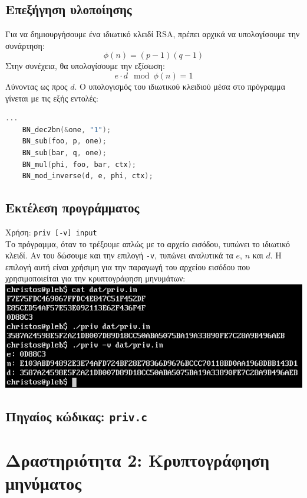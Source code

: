 \documentclass[12pt]{article}
\begin{document}
\subsection{Επεξήγηση υλοποίησης}

Για να δημιουργήσουμε ένα ιδιωτικό κλειδί RSA, πρέπει αρχικά να υπολογίσουμε
την συνάρτηση:
\[\phi(n) = (p-1)(q-1)\]
Στην συνέχεια, θα υπολογίσουμε την εξίσωση:
\[e \cdot d \mod \phi(n) = 1\]
Λύνοντας ως προς $d$. Ο υπολογισμός του ιδιωτικού κλειδιού μέσα στο πρόγραμμα
γίνεται με τις εξής εντολές: \\

\begin{lstlisting}[language=C]
	...
	BN_dec2bn(&one, "1");
	BN_sub(foo, p, one);
	BN_sub(bar, q, one);
	BN_mul(phi, foo, bar, ctx);
	BN_mod_inverse(d, e, phi, ctx);
\end{lstlisting}

\subsection{Εκτέλεση προγράμματος}

Χρήση: \lstinline{priv [-v] input} \\

Το πρόγραμμα, όταν το τρέξουμε απλώς με το αρχείο εισόδου, τυπώνει το
ιδιωτικό κλειδί. Αν του δώσουμε και την επιλογή \lstinline{-v}, τυπώνει
αναλυτικά τα $e$, $n$ και $d$. Η επιλογή αυτή είναι χρήσιμη για την
παραγωγή του αρχείου εισόδου που χρησιμοποιείται για την κρυπτογράφηση
μηνυμάτων: \\

\includegraphics[width=\textwidth]{res/priv.png} \\

\subsection{Πηγαίος κώδικας: \lstinline{priv.c}}



\section{Δραστηριότητα 2: Κρυπτογράφηση μηνύματος}
\end{document}
